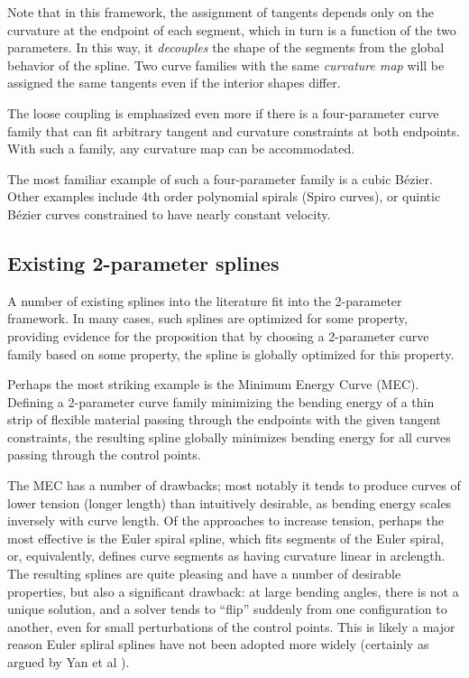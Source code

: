 \documentclass{article}
\begin{document}
Note that in this framework, the assignment of tangents depends only on the curvature at the endpoint of each segment, which in turn is a function of the two parameters. In this way, it \emph{decouples} the shape of the segments from the global behavior of the spline. Two curve families with the same \emph{curvature map} will be assigned the same tangents even if the interior shapes differ.

The loose coupling is emphasized even more if there is a four-parameter curve family that can fit arbitrary tangent and curvature constraints at both endpoints. With such a family, any curvature map can be accommodated.

The most familiar example of such a four-parameter family is a cubic B{\'e}zier. Other examples include 4th order polynomial spirals (Spiro curves), or quintic B{\'e}zier curves constrained to have nearly constant velocity.

\subsection{Existing 2-parameter splines}

A number of existing splines into the literature fit into the 2-parameter framework. In many cases, such splines are optimized for some property, providing evidence for the proposition that by choosing a 2-parameter curve family based on some property, the spline is globally optimized for this property.

Perhaps the most striking example is the Minimum Energy Curve (MEC). Defining a 2-parameter curve family minimizing the bending energy of a thin strip of flexible material passing through the endpoints with the given tangent constraints, the resulting spline globally minimizes bending energy for all curves passing through the control points.

The MEC has a number of drawbacks; most notably it tends to produce curves of lower tension (longer length) than intuitively desirable, as bending energy scales inversely with curve length. Of the approaches to increase tension, perhaps the most effective is the Euler spiral spline, which fits segments of the Euler spiral, or, equivalently, defines curve segments as having curvature linear in arclength. The resulting splines are quite pleasing and have a number of desirable properties, but also a significant drawback: at large bending angles, there is not a unique solution, and a solver tends to ``flip'' suddenly from one configuration to another, even for small perturbations of the control points. This is likely a major reason Euler spliral splines have not been adopted more widely (certainly as argued by Yan et al \cite{Yan:2017:KCI:3072959.3073692}).
\end{document}
